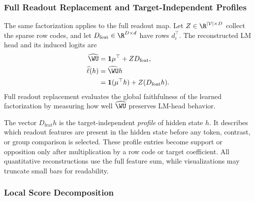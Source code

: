 \subsubsection{Full Readout Replacement and Target-Independent Profiles}

The same factorization applies to the full readout map. Let
\(Z\in\R^{|\mathcal{V}|\times D}\) collect the sparse row codes, and let
\(D_{\mathrm{feat}}\in\R^{D\times d}\) have rows \(d_i^\top\). The reconstructed
LM head and its induced logits are
\[
    \begin{aligned}
    \widehat{\WU}
    &=
    \mathbf{1}\mu^\top
    +
    ZD_{\mathrm{feat}},
    \\
    \widehat{\ell}(h)
    &=
    \widehat{\WU}h
    \\
    &=
    \mathbf{1}(\mu^\top h)
    +
    Z(D_{\mathrm{feat}}h).
    \end{aligned}
\]
Full readout replacement evaluates the global faithfulness of the learned
factorization by measuring how well \(\widehat{\WU}\) preserves LM-head
behavior.

The vector \(D_{\mathrm{feat}}h\) is the target-independent \emph{profile} of
hidden state \(h\). It describes which readout features are present in the
hidden state before any token, contrast, or group comparison is selected. These
profile entries become support or opposition only after multiplication by a row
code or target coefficient. All quantitative reconstructions use the full
feature sum, while visualizations may truncate small bars for readability.

\subsubsection{Local Score Decomposition}

